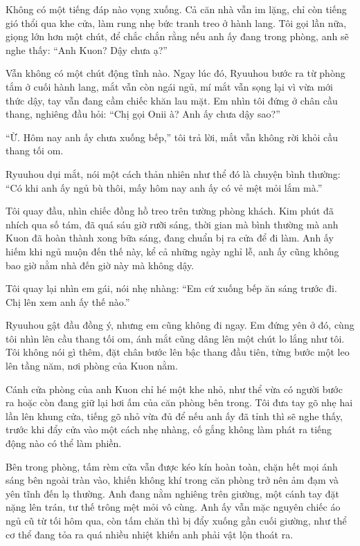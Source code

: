 \documentclass[../main.tex]{subfiles}
\begin{document}
Không có một tiếng đáp nào vọng xuống. Cả căn nhà vẫn im lặng, chỉ còn tiếng gió thổi qua khe cửa, làm rung nhẹ bức tranh treo ở hành lang. Tôi gọi lần nữa, giọng lớn hơn một chút, để chắc chắn rằng nếu anh ấy đang trong phòng, anh sẽ nghe thấy: ``Anh Kuon? Dậy chưa ạ?''

Vẫn không có một chút động tĩnh nào. Ngay lúc đó, Ryuuhou bước ra từ phòng tắm ở cuối hành lang, mắt vẫn còn ngái ngủ, mí mắt vẫn sọng lại vì vừa mới thức dậy, tay vẫn đang cầm chiếc khăn lau mặt. Em nhìn tôi đứng ở chân cầu thang, nghiêng đầu hỏi: ``Chị gọi Onii à? Anh ấy chưa dậy sao?''

``Ừ. Hôm nay anh ấy chưa xuống bếp,'' tôi trả lời, mắt vẫn không rời khỏi cầu thang tối om.

Ryuuhou dụi mắt, nói một cách thản nhiên như thể đó là chuyện bình thường: ``Có khi anh ấy ngủ bù thôi, mấy hôm nay anh ấy có vẻ mệt mỏi lắm mà.''

Tôi quay đầu, nhìn chiếc đồng hồ treo trên tường phòng khách. Kim phút đã nhích qua số tám, đã quá sáu giờ rưỡi sáng, thời gian mà bình thường mà anh Kuon đã hoàn thành xong bữa sáng, đang chuẩn bị ra cửa để đi làm. Anh ấy hiếm khi ngủ muộn đến thế này, kể cả những ngày nghỉ lễ, anh ấy cũng không bao giờ nằm nhà đến giờ này mà không dậy. 

Tôi quay lại nhìn em gái, nói nhẹ nhàng: ``Em cứ xuống bếp ăn sáng trước đi. Chị lên xem anh ấy thế nào.''

Ryuuhou gật đầu đồng ý, nhưng em cũng không đi ngay. Em đứng yên ở đó, cùng tôi nhìn lên cầu thang tối om, ánh mắt cũng dâng lên một chút lo lắng như tôi. Tôi không nói gì thêm, đặt chân bước lên bậc thang đầu tiên, từng bước một leo lên tầng năm, nơi phòng của Kuon nằm.

\ct

Cánh cửa phòng của anh Kuon chỉ hé một khe nhỏ, như thể vừa có người bước ra hoặc còn đang giữ lại hơi ấm của căn phòng bên trong. Tôi đưa tay gõ nhẹ hai lần lên khung cửa, tiếng gõ nhỏ vừa đủ để nếu anh ấy đã tỉnh thì sẽ nghe thấy, trước khi đẩy cửa vào một cách nhẹ nhàng, cố gắng không làm phát ra tiếng động nào có thể làm phiền.

Bên trong phòng, tấm rèm cửa vẫn được kéo kín hoàn toàn, chặn hết mọi ánh sáng bên ngoài tràn vào, khiến không khí trong căn phòng trở nên ảm đạm và yên tĩnh đến lạ thường. Anh đang nằm nghiêng trên giường, một cánh tay đặt nặng lên trán, tư thế trông mệt mỏi vô cùng. Anh ấy vẫn mặc nguyên chiếc áo ngủ cũ từ tối hôm qua, còn tấm chăn thì bị đẩy xuống gần cuối giường, như thể cơ thể đang tỏa ra quá nhiều nhiệt khiến anh phải vật lộn thoát ra.
\end{document}
